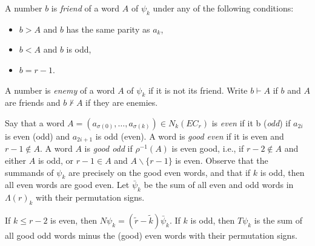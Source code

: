 A number $b$ is \emph{friend} of a word $A$ of $\psi_k$ under any of the following conditions:
\begin{itemize}
	\item $b>A$ and $b$ has the same parity as $a_{k}$,
	\item $b<A$ and $b$ is odd,
	\item $b=r-1$.
\end{itemize}
A number is \emph{enemy} of a word $A$ of $\psi_k$ if it is not its friend. Write $b\vdash A$ if $b$ and $A$ are friends and $b\not\vdash A$ if they are enemies.

Say that a word $A = (a_{\sigma(0)},\ldots,a_{\sigma(k)})\in N_k(EC_r)$ is \emph{even} if it b (\emph{odd}) if $a_{2i}$ is even (odd) and $a_{2i+1}$ is odd (even). A word is \emph{good even} if it is even and $r-1\notin A$. A word $A$ is \emph{good odd} if $\rho^{-1}(A)$ is even good, i.e., if $r-2\notin A$ and either $A$ is odd, or $r-1\in A$ and $A\smallsetminus \{r-1\}$ is even. Observe that the summands of $\psi_k$ are precisely on the good even words, and that if $k$ is odd, then all even words are good even. Let $\bar{\psi}_k$ be the sum of all even and odd words in $\Lambda(r)_k$ with their permutation signs.

\begin{lemma} \label{lemma:simp}
	If $k\leq r-2$ is even, then $N\psi_k = (\tilde{r}-\tilde{k})\bar{\psi}_k$. If $k$ is odd, then $T\psi_k$ is the sum of all good odd words minus the (good) even words with their permutation signs.
\end{lemma}

